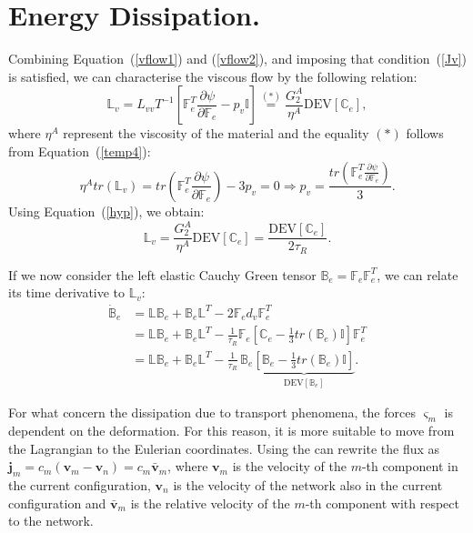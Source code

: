 \documentclass[runningheads]{llncs}
\newcommand{\F}{\ensuremath{\mathbb{F}}}
\newcommand{\LL}{\ensuremath{\mathbb{L}}}
\begin{document}
\section{Energy Dissipation.}
\label{apenergy}
Combining Equation~(\ref{vflow1}) and (\ref{vflow2}), and imposing that condition~(\ref{Jv}) is satisfied, we can characterise the viscous flow by the following relation:
\begin{equation}
\LL_v = L_{vv}T^{-1}\left[\F_e^T\frac{\partial \psi}{\partial \F_e}-p_v\mathbb{I}\right] \stackrel{(\ast)}{=} \frac{G^A_2}{\eta^A}\text{DEV}\left[\mathbb{C}_e\right] ,
\end{equation}
where $\eta^A$ represent the viscosity of the material and the equality $(\ast)$ follows from Equation~(\ref{temp4}):
\begin{equation}
\eta^A tr(\LL_v)= tr\left(\F_e^T\frac{\partial \psi}{\partial \F_e}\right) -  3 p_v=0 \Longrightarrow  p_v = \frac{tr\left(\F_e^T\frac{\partial \psi}{\partial \F_e}\right)}{3}.
\end{equation}
Using Equation~(\ref{hyp}), we obtain:
\begin{equation}
\LL_v = \frac{G^A_2 }{\eta^A}\text{DEV}[\mathbb{C}_e] = \frac{\text{DEV}[\mathbb{C}_e]}{2\tau_R}.\label{apBe}
\end{equation}

If we now consider the left elastic Cauchy Green tensor $\mathbb{B}_e=\F_e \F^T_e$, we can relate its time derivative to $\LL_v$:
\begin{equation}
\begin{aligned}
\dot{\mathbb{B}}_e &= \LL \mathbb{B}_e + \mathbb{B}_e \LL^T - 2 \F_e d_v \F_e^{T} \\
&= \LL\mathbb{B}_e + \mathbb{B}_e \LL^T - \frac{1}{\tau_R} \F_e\left[\mathbb{C}_e-\frac{1}{3}tr(\mathbb{B}_e)\mathbb{I}\right]\F_e^T\\
&= \LL\mathbb{B}_e + \mathbb{B}_e \LL^T - \frac{1}{\tau_R} \,\mathbb{B}_e\underbrace{\left[\mathbb{B}_e-\frac{1}{3}tr(\mathbb{B}_e)\mathbb{I}\right]}_{\text{DEV}[\mathbb{B}_e]}.
\end{aligned}
\end{equation}

For what concern the dissipation due to transport phenomena, the forces $\varsigma_m$ is dependent on the deformation. For this reason, it is more suitable to move from the Lagrangian to the Eulerian coordinates.  Using the  can rewrite the flux as $\mathbf{j}_m = c_m (\mathbf{v}_m-\mathbf{v}_n)= c_m \bar{\mathbf{v}}_{m}$, where $\mathbf{v}_m$ is the velocity of the $m$-th component in the current configuration, $\mathbf{v}_n$ is the velocity of the network also in the current configuration and  $\bar{\mathbf{v}}_{m}$ is the relative velocity of the $m$-th component with respect to the network. 
\end{document}
